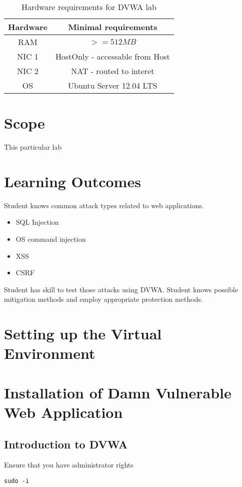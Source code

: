 \begin{table}
\centering
\caption{Hardware requirements for DVWA lab}
\begin{tabular}{|c|c|}
\hline 
\rule[-1ex]{0pt}{2.5ex} Hardware & Minimal requirements \\ 
\hline 
\rule[-1ex]{0pt}{2.5ex} RAM & $>=512MB$ \\ 
\hline 
\rule[-1ex]{0pt}{2.5ex} NIC 1 & HostOnly - accessable from Host \\ 
\hline 
\rule[-1ex]{0pt}{2.5ex} NIC 2 & NAT - routed to interet \\ 
\hline 
\rule[-1ex]{0pt}{2.5ex} OS & Ubuntu Server 12.04 LTS \\ 
\hline 
\end{tabular}
\label{HW for DVWA}
\end{table}


\section{Scope}
This particular lab 
\section{Learning Outcomes}
Student knows common attack types related to web applications.
\begin{itemize}
	\item SQL Injection
	\item OS command injection
	\item  \gls{XSS}
	\item  \gls{CSRF}
\end{itemize} Student has skill to test those attacks using \gls{DVWA}.
Student knows possible mitigation methods and employ appropriate protection methods.
\section{Setting up the Virtual Environment}
\section{Installation of Damn Vulnerable Web Application}
\subsection{Introduction to DVWA}

Ensure that you have administrator rights
\begin{verbatim}
sudo -i
\end{verbatim}

